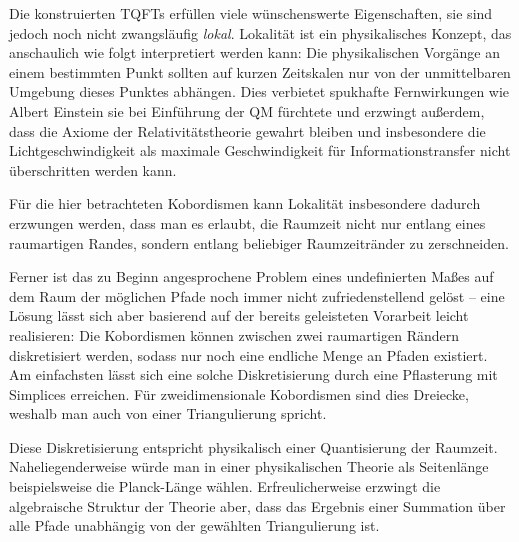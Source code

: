 Die konstruierten TQFTs erfüllen viele wünschenswerte Eigenschaften,
sie sind jedoch noch nicht zwangsläufig \textit{lokal}. Lokalität ist ein
physikalisches Konzept, das anschaulich wie folgt interpretiert werden
kann: Die physikalischen Vorgänge an einem bestimmten Punkt sollten
auf kurzen Zeitskalen nur von der unmittelbaren Umgebung dieses
Punktes abhängen. Dies verbietet spukhafte Fernwirkungen wie Albert
Einstein sie bei Einführung der QM fürchtete und erzwingt außerdem,
dass die Axiome der Relativitätstheorie gewahrt bleiben und
insbesondere die Lichtgeschwindigkeit als maximale Geschwindigkeit für
Informationstransfer nicht überschritten werden kann.

Für die hier betrachteten Kobordismen kann Lokalität insbesondere
dadurch erzwungen werden, dass man es erlaubt, die Raumzeit nicht nur
entlang eines raumartigen Randes, sondern entlang beliebiger
Raumzeitränder zu zerschneiden.

Ferner ist das zu Beginn angesprochene Problem eines undefinierten
Maßes auf dem Raum der möglichen Pfade noch immer nicht
zufriedenstellend gelöst -- eine Lösung lässt sich aber basierend auf
der bereits geleisteten Vorarbeit leicht realisieren: Die Kobordismen
können zwischen zwei raumartigen Rändern diskretisiert werden, sodass
nur noch eine endliche Menge an Pfaden existiert. Am einfachsten lässt
sich eine solche Diskretisierung durch eine Pflasterung mit
Simplices erreichen. Für zweidimensionale Kobordismen sind dies
Dreiecke, weshalb man auch von einer Triangulierung spricht.

Diese Diskretisierung entspricht physikalisch einer Quantisierung der
Raumzeit. Naheliegenderweise würde man in einer physikalischen Theorie
als Seitenlänge beispielsweise die Planck-Länge
wählen. Erfreulicherweise erzwingt die algebraische Struktur der
Theorie aber, dass das Ergebnis einer Summation über alle Pfade
unabhängig von der gewählten Triangulierung ist.

